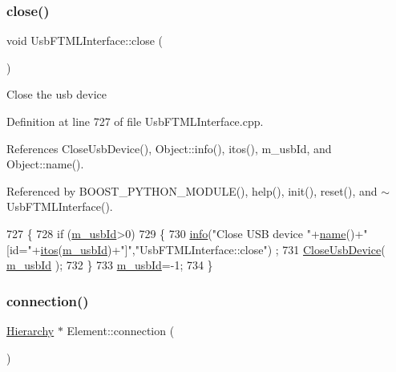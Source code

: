 \subsubsection{\texorpdfstring{close()}{close()}}
{\footnotesize\ttfamily void Usb\+F\+T\+M\+L\+Interface\+::close (\begin{DoxyParamCaption}{ }\end{DoxyParamCaption})}

Close the usb device 

Definition at line 727 of file Usb\+F\+T\+M\+L\+Interface.\+cpp.



References Close\+Usb\+Device(), Object\+::info(), itos(), m\+\_\+usb\+Id, and Object\+::name().



Referenced by B\+O\+O\+S\+T\+\_\+\+P\+Y\+T\+H\+O\+N\+\_\+\+M\+O\+D\+U\+L\+E(), help(), init(), reset(), and $\sim$\+Usb\+F\+T\+M\+L\+Interface().


\begin{DoxyCode}
727                                \{
728   \textcolor{keywordflow}{if} (\hyperlink{classUsbFTMLInterface_aab6754587c303660d5c498ce34a2b4c8}{m\_usbId}>0)
729   \{    
730     \hyperlink{classObject_a644fd329ea4cb85f54fa6846484b84a8}{info}(\textcolor{stringliteral}{"Close USB device "}+\hyperlink{classObject_a300f4c05dd468c7bb8b3c968868443c1}{name}()+\textcolor{stringliteral}{" [id="}+\hyperlink{Tools_8h_af330027dbdafb9a30768b3613c553e60}{itos}(\hyperlink{classUsbFTMLInterface_aab6754587c303660d5c498ce34a2b4c8}{m\_usbId})+\textcolor{stringliteral}{"]"},\textcolor{stringliteral}{"UsbFTMLInterface::close"})
      ;
731     \hyperlink{LALUsbML_8h_a3f0a3f9e09951c39ae1df0638008875a}{CloseUsbDevice}( \hyperlink{classUsbFTMLInterface_aab6754587c303660d5c498ce34a2b4c8}{m\_usbId} );
732   \}
733   \hyperlink{classUsbFTMLInterface_aab6754587c303660d5c498ce34a2b4c8}{m\_usbId}=-1;
734 \}
\end{DoxyCode}
\mbox{\label{classElement_af57444353c1ddf9fa0109801e97debf7}} 
\subsubsection{\texorpdfstring{connection()}{connection()}}
{\footnotesize\ttfamily \hyperlink{classHierarchy}{Hierarchy} $\ast$ Element\+::connection (\begin{DoxyParamCaption}{ }\end{DoxyParamCaption})\hspace{0.3cm}{\ttfamily [inherited]}}

